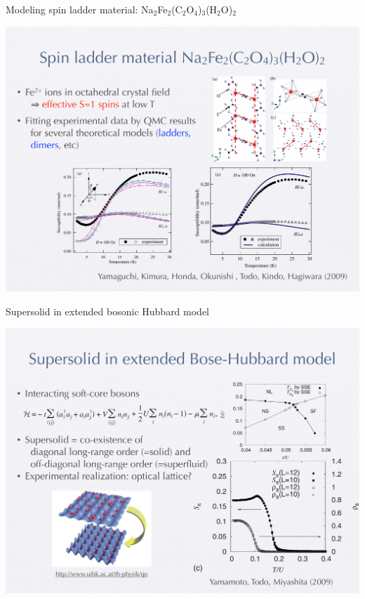 \begin{frame}[fragile]{Modeling spin ladder material: Na$_2$Fe$_2$(C$_2$O$_4$)$_3$(H$_2$O)$_2$}
  \begin{center}
    \includegraphics[height=.8\textheight]{ladder.pdf}
  \end{center}
\end{frame}

\begin{frame}[fragile]{Supersolid in extended bosonic Hubbard model}
  \begin{center}
    \includegraphics[height=.8\textheight]{supersolid.pdf}
  \end{center}
\end{frame}

